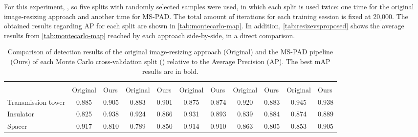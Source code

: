 \documentclass[10pt,conference]{IEEEtran}
\begin{document}
For this experiment, , so five splits with randomly selected samples were used, in which each split is used twice: one time for the original image-resizing approach and another time for MS-PAD. The total amount of iterations for each training session is fixed at 20,000. The obtained results regarding AP for each split are shown in \autoref{tab:montecarlo-map}. In addition, \autoref{tab:resizevsproposed} shows the average results from \autoref{tab:montecarlo-map} reached by each approach side-by-side, in a direct comparison.

\begin{table*}[htpb]
\centering
\caption{Comparison of detection results of the original image-resizing approach (Original) and the MS-PAD pipeline (Ours) of each Monte Carlo cross-validation split () relative to the Average Precision (AP). The best mAP results are in bold.}
\begin{tabular}{lcccccccccc}
\toprule
  & \multicolumn{2}{c}{}                       & \multicolumn{2}{c}{}                       & \multicolumn{2}{c}{}                       & \multicolumn{2}{c}{}                       & \multicolumn{2}{c}{}                       \\
  \cmidrule(lr){2-3} \cmidrule(lr){4-5} \cmidrule(lr){6-7} \cmidrule(lr){8-9} \cmidrule(lr){10-11}
                  & \multicolumn{1}{l}{Original} & \multicolumn{1}{l}{Ours} & \multicolumn{1}{l}{Original} & \multicolumn{1}{l}{Ours} & \multicolumn{1}{l}{Original} & \multicolumn{1}{l}{Ours} & \multicolumn{1}{l}{Original} & \multicolumn{1}{l}{Ours} & \multicolumn{1}{l}{Original} & \multicolumn{1}{l}{Ours} \\
\midrule
Transmission tower & 0.885                      & 0.905                    & 0.883                      & 0.901                    & 0.875                      & 0.874                    & 0.920                      & 0.883                    & 0.945                      & 0.938                    \\
Insulator          & 0.825                      & 0.938                    & 0.924                      & 0.866                    & 0.931                      & 0.893                    & 0.839                      & 0.884                    & 0.874                      & 0.889                    \\
Spacer             & 0.917                      & 0.810                    & 0.789                      & 0.850                    & 0.914                      & 0.910                    & 0.863                      & 0.805                    & 0.853                      & 0.905                    \\

\end{tabular}
\end{table*}
\end{document}
